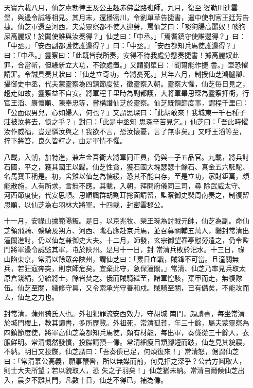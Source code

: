 \begin{pinyinscope}
 天寶六載八月，仙芝虜勃律王及公主趣赤佛堂路班師。九月，復至
 婆勒川連雲堡，與邊令誠等相見。其月末，還播密川，令劉單草告捷書，遣中使判官王廷芳告捷。仙芝軍還至河西，夫蒙靈察都不使人迎勞，罵仙芝曰：「啖狗腸高麗奴！啖狗屎高麗奴！於闐使誰與汝奏得？」仙芝曰：「中丞。」「焉耆鎮守使誰邊得？」曰：「中丞。」「安西副都護使誰邊得？」曰：「中丞。」「安西都知兵馬使誰邊得？」曰：「中丞。」靈察曰：「此既皆我所奏，安得不待我處分懸奏捷書！據高麗奴此罪，合當斬，但緣新立大功，不欲處置。」又謂劉單曰：「聞爾能作捷
 書。」單恐懼請罪。令誠具奏其狀曰：「仙芝立奇功，今將憂死。」其年六月，制授仙芝鴻臚卿、攝御史中丞，代夫蒙靈察為四鎮節度使，徵靈察入朝。靈察大懼，仙芝每日見之，趨走如故，靈察益不自安。將軍程千里時為副都護，大將軍畢思琛為靈察押衙，行官王滔、康懷順、陳奉忠等，嘗構譖仙芝於靈察。仙芝既領節度事，謂程千里曰：「公面似男兒，心如婦人，何也？」又謂思琛曰：「此胡敢來！我城東一千石種子莊被汝將去，憶之乎？」對曰：「此是中丞知
 思琛辛苦見乞。」仙芝曰：「吾此時懼汝作威福，豈是憐汝與之！我欲不言，恐汝懷憂，言了無事矣。」又呼王滔等至，捽下將笞，良久皆釋之，由是軍情不懼。



 八載，入朝，加特進，兼左金吾衛大將軍同正員，仍與一子五品官。九載，將兵討石國，平之，獲其國王以歸。仙芝性貪，獲石國大塊瑟瑟十餘石、真金五六馲駝、名馬寶玉稱是。初，舍雞以仙芝為懦緩，恐其不能自存，至是立功，家財鉅萬，頗能散施，人有所求，言無不應。其載，入朝，拜開府儀同三司，尋
 除武威太守、河西節度使，代安思順。思順諷群胡割耳捴面請留，監察御史裴周南奏之，制復留思順，以仙芝為右羽林大將軍。十四載，封密雲郡公。



 十一月，安祿山據範陽叛。是日，以京兆牧、榮王琬為討賊元帥，仙芝為副。命仙芝領飛騎、彍騎及朔方、河西、隴右應赴京兵馬，並召募關輔五萬人，繼封常清出潼關進討，仍以仙芝兼御史大夫。十二月，師發，玄宗御望春亭慰勞遣之，仍令監門將軍邊令誠監其軍，屯於陜州。是月十一日，封
 常清兵敗於汜水。十三日，祿山陷東京，常清以餘眾奔陜州，謂仙芝曰：「累日血戰，賊鋒不可當。且潼關無兵，若狂寇奔突，則京師危矣。宜棄此守，急保潼關。」常清、仙芝乃率見兵取太原倉錢絹，分給將士，餘皆焚之。俄而賊騎繼至，諸軍惶駭，棄甲而走，無復隊伍。仙芝至關，繕修守具，又令索承光守善和戍。賊騎至關，已有備矣，不能攻而去，仙芝之力也。



 封常清，蒲州猗氏人也。外祖犯罪流安西效力，守胡城
 南門，頗讀書，每坐常清於城門樓上，教其讀書，多所歷覽。外祖死，常清孤貧，年三十餘，屬夫蒙靈察為四鎮節度使，將軍高仙芝為都知兵馬使，頗有材能，每出軍，奏傔從三十餘人，衣服鮮明。常清慨然發憤，投牒請預一傔。常清細瘦目類腳短而跛，仙芝見其貌寢，不納。明日又投牒，仙芝謂曰：「吾奏傔已足，何煩復來！」常清怒，倨謂仙芝曰：「常清慕公高義，願事鞭轡，所以無媒而前，何見拒之深乎？公若方圓取人，則士大夫所望；若以貌取人，恐
 失之子羽矣！」仙芝猶未納。常清自爾候仙芝出入，晨夕不離其門，凡數十日，仙芝不得已，補為傔。




\end{pinyinscope}
